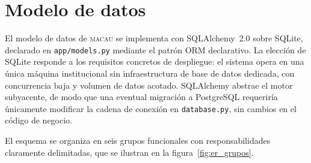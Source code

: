 \section{Modelo de datos}
\label{sec:modelo_datos}

El modelo de datos de \textsc{macau} se implementa con SQLAlchemy~2.0 sobre
SQLite, declarado en \texttt{app/models.py} mediante el patrón ORM declarativo.
La elección de SQLite responde a los requisitos concretos de despliegue: el
sistema opera en una única máquina institucional sin infraestructura de base de
datos dedicada, con concurrencia baja y volumen de datos acotado. SQLAlchemy
abstrae el motor subyacente, de modo que una eventual migración a PostgreSQL
requeriría únicamente modificar la cadena de conexión en \texttt{database.py},
sin cambios en el código de negocio.

El esquema se organiza en seis grupos funcionales con responsabilidades claramente
delimitadas, que se ilustran en la figura~\ref{fig:er_grupos}.

